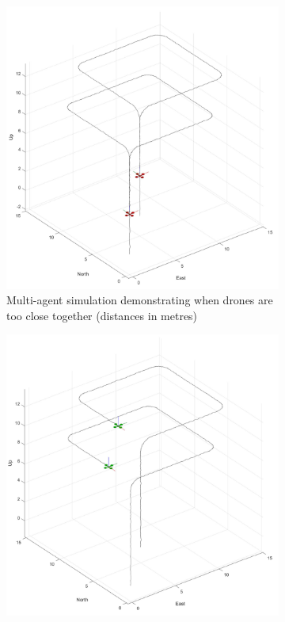 \begin{figure}[H]
    \centering
    \begin{subfigure}[b]{0.48\textwidth} %
        \centering
        \includegraphics[width=\textwidth]{figs/Samuel/Figures/MultiAgentExampleRed (2).pdf}
        \caption{Multi-agent simulation demonstrating when drones are too close together (distances in metres)}
        \label{fig:1a}
    \end{subfigure}
    \hspace{0.01\textwidth}
    \begin{subfigure}[b]{0.48\textwidth} %
        \centering
        \includegraphics[width=\textwidth]{figs/Samuel/Figures/MultiAgentExampleGreen (2).pdf}

\end{subfigure}
\end{figure}
